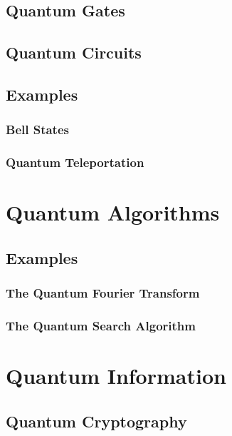 \documentclass{article}
\begin{document}
    \subsection{Quantum Gates}

    \subsection{Quantum Circuits}

    \subsection{Examples}

        \subsubsection{Bell States}

        \subsubsection{Quantum Teleportation}

\section{Quantum Algorithms}

    \subsection{Examples}

        \subsubsection{The Quantum Fourier Transform}

        \subsubsection{The Quantum Search Algorithm}

\section{Quantum Information}

    \subsection{Quantum Cryptography}

\newpage
\nocite{*}
\printbibliography
\end{document}
